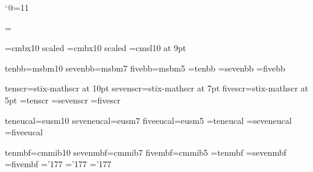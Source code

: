 \catcode`@=11

\parskip=\smallskipamount
\parindent=0pt

\let\ea=\expandafter
\let\:=\colon
\let\dsty=\displaystyle
\let\tsty=\textstyle
\let\ssty=\scriptstyle
\let\sssty=\scriptscriptstyle

\font\ftitle=cmbx10 scaled 
\font\fprobtitle=cmbx10 scaled 
\font\fprobdesc=cmsl10 at 9pt

\def\loadfont#1#2#3#4#5{%
	\ea\font\csname ten#1\endcsname=#2
	\ea\font\csname seven#1\endcsname=#3
	\ea\font\csname five#1\endcsname=#4
	\ea\textfont\ea#5\ea=\csname ten#1\endcsname
	\ea\scriptfont\ea#5\ea=\csname seven#1\endcsname
	\ea\scriptscriptfont\ea#5\ea=\csname five#1\endcsname
	\ea\def\csname #1\endcsname{\fam#5}}

\newfam\bbfam
\loadfont{bb}{msbm10}{msbm7}{msbm5}\bbfam

\newfam\scrfam
\loadfont{scr}{stix-mathscr at 10pt}{stix-mathscr at 7pt}%
	{stix-mathscr at 5pt}\scrfam

\newfam\eucalfam
\loadfont{eucal}{eusm10}{eusm7}{eusm5}\eucalfam

\newfam\mbffam
\loadfont{mbf}{cmmib10}{cmmib7}{cmmib5}\mbffam
\skewchar\tenmbf='177
\skewchar\sevenmbf='177
\skewchar\fivembf='177

\def\1#1#2{#1} %
\def\2#1#2{#2} %

\def\hugeskip{\vskip 24pt plus 8pt\relax}

\def\lxor{\oplus}
\def\limp{\rightarrow}
\def\Limp{\Rightarrow}
\def\liff{\leftrightarrow}
\def\Liff{\Leftrightarrow}

\def\N{{\bb N}}
\def\Z{{\bb Z}}
\def\Q{{\bb Q}}
\def\R{{\bb R}}
\def\powset{{\scr P}}

\def\bigo{{\eucal O}}
\def\littleo{{\mit o}}
\def\bigomega{{\rm \Omega}}
\def\littleomega{\omega}
\def\bigtheta{{\rm \Theta}}

\def\ihat{{\bf\mathaccent"705E \mathchar"7010}}
\def\jhat{{\bf\mathaccent"705E \mathchar"7011}}
\def\khat{{\bf\mathaccent"705E k}}

\def\?{\mathrel{\mathop=\limits^?}}
\def\d{{\rm d}} %
\def\falling#1#2{#1^{\underline{#2}}}
\def\rising#1#2{#1^{\overline{#2}}}

